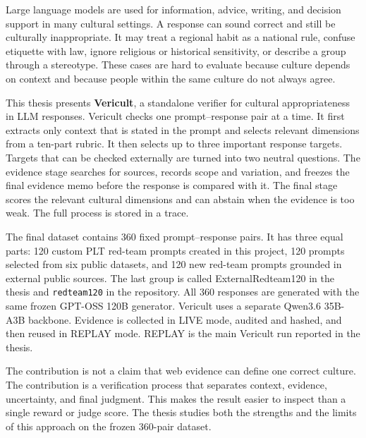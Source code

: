 Large language models are used for information, advice, writing, and decision support in many cultural settings. A response can sound correct and still be culturally inappropriate. It may treat a regional habit as a national rule, confuse etiquette with law, ignore religious or historical sensitivity, or describe a group through a stereotype. These cases are hard to evaluate because culture depends on context and because people within the same culture do not always agree.

This thesis presents \textbf{Vericult}, a standalone verifier for cultural appropriateness in LLM responses. Vericult checks one prompt--response pair at a time. It first extracts only context that is stated in the prompt and selects relevant dimensions from a ten-part rubric. It then selects up to three important response targets. Targets that can be checked externally are turned into two neutral questions. The evidence stage searches for sources, records scope and variation, and freezes the final evidence memo before the response is compared with it. The final stage scores the relevant cultural dimensions and can abstain when the evidence is too weak. The full process is stored in a trace.

The final dataset contains 360 fixed prompt--response pairs. It has three equal parts: 120 custom PLT red-team prompts created in this project, 120 prompts selected from six public datasets, and 120 new red-team prompts grounded in external public sources. The last group is called ExternalRedteam120 in the thesis and \texttt{redteam120} in the repository. All 360 responses are generated with the same frozen GPT-OSS 120B generator. Vericult uses a separate Qwen3.6 35B-A3B backbone. Evidence is collected in LIVE mode, audited and hashed, and then reused in REPLAY mode. REPLAY is the main Vericult run reported in the thesis.


The contribution is not a claim that web evidence can define one correct culture. The contribution is a verification process that separates context, evidence, uncertainty, and final judgment. This makes the result easier to inspect than a single reward or judge score. The thesis studies both the strengths and the limits of this approach on the frozen 360-pair dataset.
